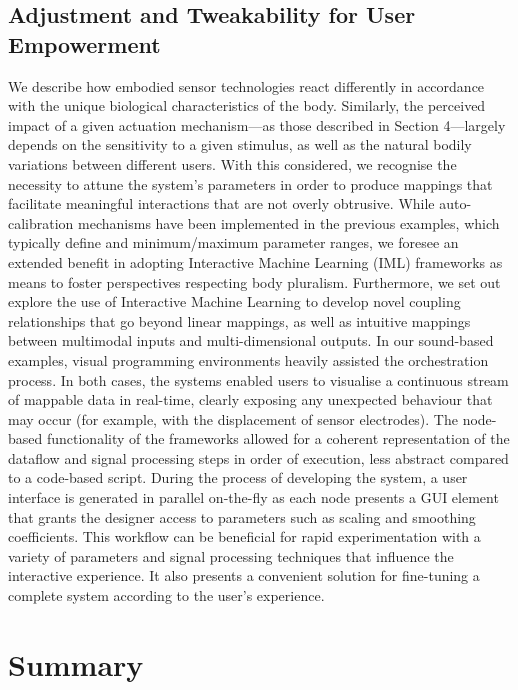 \subsection*{Adjustment and Tweakability for User Empowerment}
We describe how embodied sensor technologies react differently in accordance with the unique biological characteristics of the body. Similarly, the perceived impact of a given actuation mechanism—as those described in Section 4—largely depends on the sensitivity to a given stimulus, as well as the natural bodily variations between different users. With this considered, we recognise the necessity to attune the system’s parameters in order to produce mappings that facilitate meaningful interactions that are not overly obtrusive. While auto-calibration mechanisms have been implemented in the previous examples, which typically define and minimum/maximum parameter ranges, we foresee an extended benefit in adopting Interactive Machine Learning (IML) \cite{fails_interactive_2003,amershi_power_2014} frameworks as means to foster perspectives respecting body pluralism. Furthermore, we set out explore the use of Interactive Machine Learning to develop novel coupling relationships that go beyond linear mappings, as well as intuitive mappings between multimodal inputs and multi-dimensional outputs. In our sound-based examples, visual programming environments heavily assisted the orchestration process. In both cases, the systems enabled users to visualise a continuous stream of mappable data in real-time, clearly exposing any unexpected behaviour that may occur (for example, with the displacement of sensor electrodes). The node-based functionality of the frameworks allowed for a coherent representation of the dataflow and signal processing steps in order of execution, less abstract compared to a code-based script. During the process of developing the system, a user interface is generated in parallel on-the-fly as each node presents a GUI element that grants the designer access to parameters such as scaling and smoothing coefficients.
This workflow can be beneficial for rapid experimentation with a variety of parameters and signal processing techniques that influence the interactive experience. It also presents a convenient solution for fine-tuning a complete system according to the user’s experience.

\section{Summary}


